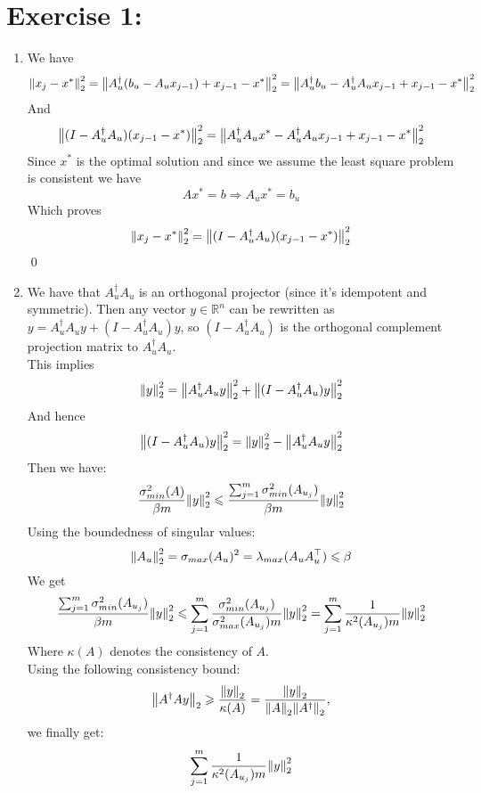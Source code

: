 \documentclass[12pt,letterpaper]{article}
\newcommand{\R}{\mathbb{R}}
\renewcommand{\le}{\leqslant}
\renewcommand{\ge}{\geqslant}
\begin{document}
\section*{
Exercise 1:}
\begin{enumerate}
    \item 
We have 
$$
\norm{x_j -x^*}_2^2 = \norm{ A^\dag_u(b_u-A_ux_{j-1}) + x_{j-1} -x^*}_2^2
= \norm{ A^\dag_u b_u -  A^\dag_u A_ux_{j-1} + x_{j-1} -x^*}_2^2
$$
And 
$$
\norm{(I-A_u^\dag A_u)(x_{j-1}-x^*)}_2^2=
\norm{A_u^\dag A_u x^* - A_u^\dag A_u x_{j-1}+ x_{j-1}-x^*}_2^2
$$
Since $x^*$ is the optimal solution and since we assume the least square problem is consistent we have 
$$
Ax^* = b \Rightarrow A_ux^* = b_u
$$
Which proves
$$
\norm{x_j -x^*}_2^2 = \norm{(I-A_u^\dag A_u)(x_{j-1}-x^*)}_2^2
$$    \qed
    \item 
We have that $A^\dag_uA_u$ is an orthogonal projector (since it's idempotent and symmetric). Then any vector $y\in \R^n$ can be rewritten as $y = A^\dag_uA_uy + (I - A^\dag_uA_u)y$, so $(I - A^\dag_uA_u)$ is the orthogonal complement projection matrix to $A^\dag_uA_u$.\\
This implies 
$$
\norm{y}^2_2 = \norm{A^\dag_uA_uy}^2_2 + \norm{(I - A^\dag_uA_u)y}^2_2
$$
And hence 
$$
\norm{(I - A^\dag_uA_u)y}^2_2 = \norm{y}^2_2 - \norm{A^\dag_uA_uy}^2_2
$$
Then we have:
$$
\frac{\sigma^2_{min}(A)}{\beta m}\norm{y}^2_2
\le
\frac{\sum_{j=1}^m \sigma^2_{min}(A_{u_j})}{\beta m}\norm{y}^2_2
$$
Using the boundedness of singular values:
$$
\norm{A_u}_2^2 = \sigma_{max}(A_u)^2 = \lambda_{max}(A_uA_u^\top ) \le \beta
$$
We get
$$
\frac{\sum_{j=1}^m \sigma^2_{min}(A_{u_j})}{\beta m}\norm{y}^2_2
\le 
\sum_{j=1}^m \frac{\sigma^2_{min}(A_{u_j})}{\sigma^2_{max}(A_{u_j}) m}\norm{y}^2_2
= 
\sum_{j=1}^m \frac{1}{\kappa^2(A_{u_j}) m}\norm{y}^2_2
$$
Where $\kappa(A)$ denotes the consistency of $A$.\\
Using the following consistency bound:
$$
\norm{A^\dag Ay}_2 \ge \frac{\norm{y}_2}{\kappa(A)} = \frac{\norm{y}_2}{\norm{A}_2\norm{A^\dag}_2},
$$
we finally get:
$$
\sum_{j=1}^m \frac{1}{\kappa^2(A_{u_j}) m}\norm{y}^2_2 
$$
\end{enumerate}
\end{document}
